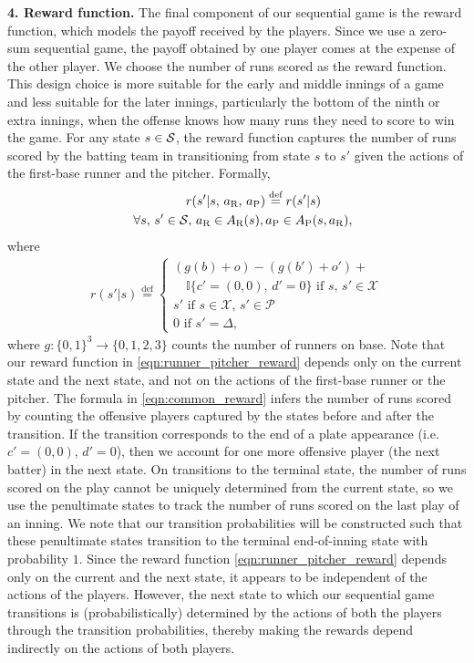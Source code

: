 \documentclass[opre,dblanonrev]{informs4}
\newcommand{\defeq}{\stackrel{\text{def}}{=}}
\begin{document}
    {\bf 4. Reward function.} The final component of our sequential game is the reward function, which models the payoff received by the players. Since we use a  zero-sum sequential game, the payoff obtained by one player comes at the expense of the other player. We choose the number of runs scored as the reward function. This design choice is more suitable for the early and middle innings of a game and less suitable for the later innings, particularly the bottom of the ninth or extra innings, when the offense knows how many runs they need to score to win the game. For any state $s \in {\cal S}$, the reward function captures the number of runs scored by the batting team in transitioning from state $s$ to $s'$ given the actions of the first-base runner and the pitcher. Formally,
    \begin{align}
      \label{eqn:runner_pitcher_reward}
        r(s'|s,\, a_\text{R},\, a_\text{P}) &\defeq r(s'|s) \\
        \nonumber
        \quad 
        \forall s,\, s' \in {\cal S},\, a_\text{R} \in A_\text{R}(s),\, & a_\text{P} \in A_\text{P}(s,a_\text{R}),
    \end{align}
    where
    \begin{align}
      \label{eqn:common_reward}
      r(s'|s) \defeq  \begin{cases}
          (g(b) + o) - (g(b') + o') +\\ \quad \mathbb{I}\{c' = (0, 0),\, d' = 0\} \text{ if } s,\, s' \in \mathcal{X}\\
          s'  \text{ if } s \in \mathcal{X},\, s' \in \mathcal{P}\\
          0  \text{ if } s' = \Delta,
      \end{cases} 
    \end{align}
    where $g: \{0, 1\}^3 \rightarrow \{0, 1, 2, 3\}$ counts the number of runners on base. Note that our reward function in \eqref{eqn:runner_pitcher_reward} depends only on the current state and the next state, and not on the actions of the first-base runner or the pitcher. The formula in \eqref{eqn:common_reward} infers the number of runs scored by counting the offensive players captured by the states before and after the transition. If the transition corresponds to the end of a plate appearance (i.e. $c' = (0, 0),\, d' = 0$), then we account for one more offensive player (the next batter) in the next state. On transitions to the terminal state, the number of runs scored on the play cannot be uniquely determined from the current state, so we use the penultimate states to track the number of runs scored on the last play of an inning. We note that our transition probabilities will be constructed such that these penultimate states transition to the terminal end-of-inning state with probability $1$. Since the reward function \eqref{eqn:runner_pitcher_reward} depends only on the current and the next state, it appears to be independent of the actions of the players. However, the next state to which our sequential game transitions is (probabilistically) determined by the actions of both the players through the transition probabilities, thereby making the rewards depend indirectly on the actions of both players.
\end{document}
